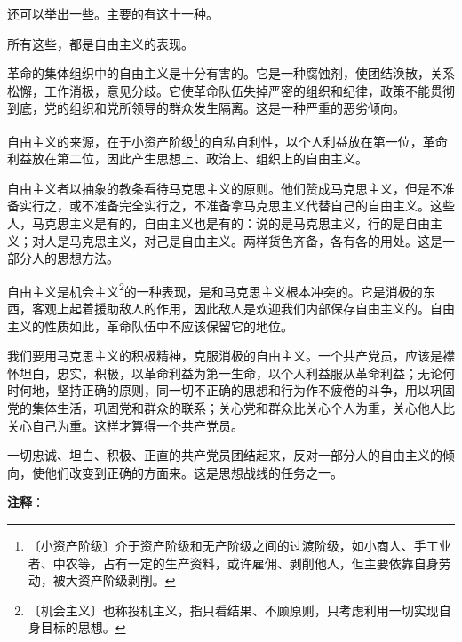 \documentclass[12pt,UTF-8,openany]{ctexbook}
\begin{document}
\begin{normalsize}
    还可以举出一些。主要的有这十一种。
    
    所有这些，都是自由主义的表现。
    
    革命的集体组织中的自由主义是十分有害的。它是一种腐蚀剂，使团结涣散，关系松懈，工作消极，意见分歧。它使革命队伍失掉严密的组织和纪律，政策不能贯彻到底，党的组织和党所领导的群众发生隔离。这是一种严重的恶劣倾向。
    
    自由主义的来源，在于小资产阶级\footnote{〔小资产阶级〕介于资产阶级和无产阶级之间的过渡阶级，如小商人、手工业者、中农等，占有一定的生产资料，或许雇佣、剥削他人，但主要依靠自身劳动，被大资产阶级剥削。}的自私自利性，以个人利益放在第一位，革命利益放在第二位，因此产生思想上、政治上、组织上的自由主义。
    
    自由主义者以抽象的教条看待马克思主义的原则。他们赞成马克思主义，但是不准备实行之，或不准备完全实行之，不准备拿马克思主义代替自己的自由主义。这些人，马克思主义是有的，自由主义也是有的：说的是马克思主义，行的是自由主义；对人是马克思主义，对己是自由主义。两样货色齐备，各有各的用处。这是一部分人的思想方法。
    
    自由主义是机会主义\footnote{〔机会主义〕也称投机主义，指只看结果、不顾原则，只考虑利用一切实现自身目标的思想。}的一种表现，是和马克思主义根本冲突的。它是消极的东西，客观上起着援助敌人的作用，因此敌人是欢迎我们内部保存自由主义的。自由主义的性质如此，革命队伍中不应该保留它的地位。
    
    我们要用马克思主义的积极精神，克服消极的自由主义。一个共产党员，应该是襟怀坦白，忠实，积极，以革命利益为第一生命，以个人利益服从革命利益；无论何时何地，坚持正确的原则，同一切不正确的思想和行为作不疲倦的斗争，用以巩固党的集体生活，巩固党和群众的联系；关心党和群众比关心个人为重，关心他人比关心自己为重。这样才算得一个共产党员。
    
    一切忠诚、坦白、积极、正直的共产党员团结起来，反对一部分人的自由主义的倾向，使他们改变到正确的方面来。这是思想战线的任务之一。
    
\end{normalsize}


\newpage

\textbf{注释}：

\vspace{-1em}
\end{document}
